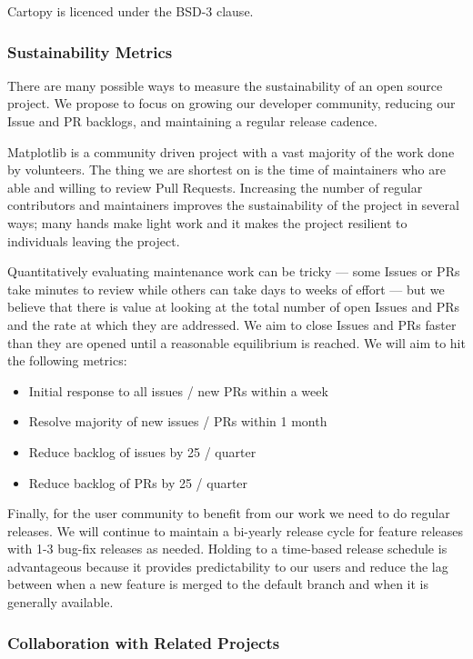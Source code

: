 \documentclass[12pt]{article}
\numberwithin{page}{section}
\begin{document}
Cartopy is licenced under the BSD-3 clause.


\subsubsection{Sustainability Metrics}

There are many possible ways to measure the sustainability of an
open source project.  We propose to focus on growing our developer
community, reducing our Issue and PR backlogs, and maintaining a
regular release cadence.

Matplotlib is a community driven project with a vast majority of the
work done by volunteers.  The thing we are shortest on is the time of
maintainers who are able and willing to review Pull Requests.
Increasing the number of regular contributors and maintainers improves
the sustainability of the project in several ways; many hands make
light work and it makes the project resilient to individuals leaving
the project.

Quantitatively evaluating maintenance work can be tricky --- some
Issues or PRs take minutes to review while others can take days to
weeks of effort --- but we believe that there is value at looking at
the total number of open Issues and PRs and the rate at which they are
addressed.  We aim to close Issues and PRs faster than they are opened
until a reasonable equilibrium is reached.  We will aim to hit the
following metrics:
\begin{itemize}[noitemsep]
\item Initial response to all issues / new PRs within a week
\item Resolve majority of new issues / PRs within 1 month
\item Reduce backlog of issues by 25 / quarter
\item Reduce backlog of PRs by 25 / quarter
\end{itemize}

Finally, for the user community to benefit from our work we need to do
regular releases.  We will continue to maintain a bi-yearly release
cycle for feature releases with 1-3 bug-fix releases as needed.
Holding to a time-based release schedule is advantageous because it
provides predictability to our users and reduce the lag between when a
new feature is merged to the default branch and when it is generally
available.


\subsubsection{Collaboration with Related Projects}
\end{document}
